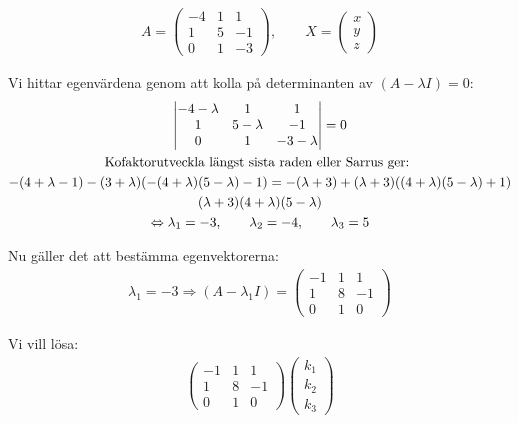 \begin{equation*}
  \begin{gathered}
    A = \begin{pmatrix}-4&1&1\\1&5&-1\\0&1&-3\end{pmatrix},\qquad X = \begin{pmatrix}x\\y\\z\end{pmatrix}
  \end{gathered}
\end{equation*}
\par\bigskip
\noindent Vi hittar egenvärdena genom att kolla på determinanten av $(A-\lambda I)=0$:
\begin{equation*}
  \begin{gathered}
    \begin{vmatrix}-4-\lambda&1&1\\1&5-\lambda&-1\\0&1&-3-\lambda\end{vmatrix} = 0\\
    \text{Kofaktorutveckla längst sista raden eller Sarrus ger: }\\
    -(4+\lambda-1)-(3+\lambda)(-(4+\lambda)(5-\lambda)-1)= -(\lambda+3)+(\lambda+3)((4+\lambda)(5-\lambda)+1)\\
    (\lambda+3)(4+\lambda)(5-\lambda)\\
    \Leftrightarrow \lambda_1 = -3,\qquad\lambda_2 = -4,\qquad\lambda_3 = 5
  \end{gathered}
\end{equation*}
\par\bigskip
\noindent Nu gäller det att bestämma egenvektorerna:
\begin{equation*}
  \begin{gathered}
    \lambda_1 = -3 \Rightarrow (A-\lambda_1 I) = \begin{pmatrix}-1&1&1\\1&8&-1\\0&1&0\end{pmatrix}
  \end{gathered}
\end{equation*}
\par\bigskip
\noindent Vi vill lösa:
\begin{equation*}
  \begin{gathered}
    \begin{pmatrix}-1&1&1\\1&8&-1\\0&1&0\end{pmatrix}\begin{pmatrix}k_1\\k_2\\k_3\end{pmatrix}
  \end{gathered}
\end{equation*}
